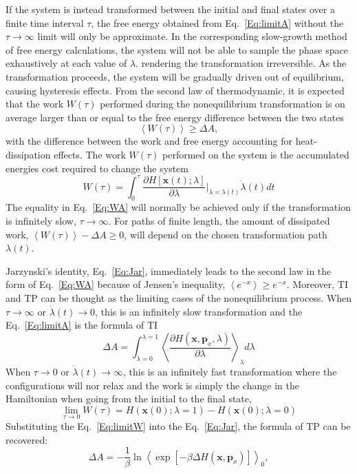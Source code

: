If the system is instead transformed between the initial and final states over a finite time interval $\tau$, the free energy obtained from Eq.~\ref{Eq:limitA} without the $\tau\to\infty$ limit will only be approximate. In the corresponding slow-growth method of free energy calculations, the system will not be able to sample the phase space exhaustively at each value of $\lambda$. rendering the transformation irreversible. As the transformation proceeds, the system will be gradually driven out of equilibrium, causing hysteresis effects. From the second law of thermodynamic, it is expected that the work $W(\tau)$ performed during the nonequilibrium transformation is on average larger than or equal to the free energy difference between the two states
\begin{equation}
\left \langle W(\tau) \right \rangle \ge \Delta A,
\label{Eq:WA}
\end{equation} 
with the difference between the work and free energy accounting for heat-dissipation effects. The work $W(\tau)$ performed on the system is the accumulated energies cost required to change the system
\begin{equation}
W(\tau) = \int_{0}^{\tau} \frac{\partial{H[\textbf{x}(t);\lambda]}}{\partial{\lambda}}\bigg\rvert_{\lambda=\lambda(t)} \dot{\lambda}(t) dt
\label{Eq:work}
\end{equation}    
The equality in Eq.~\ref{Eq:WA} will normally be achieved only if the transformation is infinitely slow, $\tau\to\infty$.  For paths of finite length, the amount of dissipated work, $\left \langle W(\tau) \right \rangle - \Delta A \ge 0$, will depend on the chosen transformation path $\lambda(t)$.

Jarzynski's identity, Eq.~\ref{Eq:Jar}, immediately leads to the second law in the form of Eq.~\ref{Eq:WA} because of Jensen's inequality, $\left \langle e^{-x} \right \rangle \ge e^{-x} $.
Moreover, TI and TP can be thought as the limiting cases of the nonequilibrium process. When $\tau\to\infty$ or $\dot{\lambda}(t)\to0$, this is an infinitely slow transformation and the Eq.~\ref{Eq:limitA} is the formula of TI
\begin{equation}
\Delta A = \int_{\lambda=0}^{\lambda=1}\left \langle \frac{\partial{H(\textbf{x},\textbf{p}_{x},\lambda)}}{\partial{\lambda}} \right \rangle_{\lambda} d\lambda
\label{Eq:TINEW}
\end{equation}  
When $\tau\to0$ or $\dot{\lambda}(t)\to\infty$, this is an infinitely fast transformation where the configurations will nor relax and the work is simply the change in the Hamiltonian when going from the initial to the final state,
\begin{equation}
\lim_{\tau\to0}W(\tau) = H(\textbf{x}(0);\lambda=1)-H(\textbf{x}(0);\lambda=0)
\label{Eq:limitW}
\end{equation}
Substituting the Eq.~\ref{Eq:limitW} into the Eq.~\ref{Eq:Jar}, the formula of TP can be recovered:
\begin{equation}
\Delta A = -\frac{1}{\beta} \ln \left \langle \exp[-\beta \Delta H(\textbf{x},\textbf{p}_{x})] \right \rangle  _{0},
\label{Eq:deltaA4NEW}
\end{equation}

